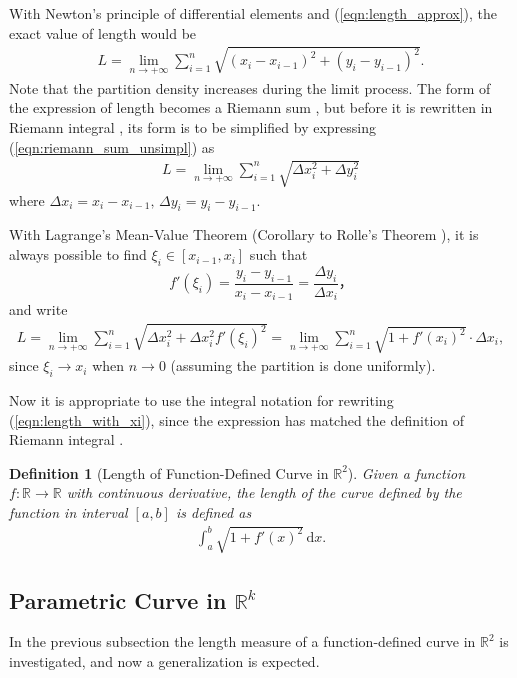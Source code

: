 \documentclass[12pt,a4paper]{article}
\newtheorem{definition}{Definition}
\newcommand{\eqnref}[1]{(\ref{#1})}
\begin{document}
With Newton's principle of differential elements \cite{newton_pnpm} and \eqnref{eqn:length_approx}, the exact value of length would be \begin{gather}\label{eqn:riemann_sum_unsimpl}L=\lim_{n\to+\infty}\sum_{i=1}^n\sqrt{(x_i-x_{i-1})^2+(y_i-y_{i-1})^2}.\end{gather} Note that the partition density increases during the limit process. The form of the expression of length becomes a Riemann sum \cite{riemann_sum_integral}, but before it is rewritten in Riemann integral \cite{riemann_sum_integral}, its form is to be simplified by expressing \eqnref{eqn:riemann_sum_unsimpl} as \begin{gather}\label{eqn:length_with_delta}L=\lim_{n\to+\infty}\sum_{i=1}^n\sqrt{\Delta x_i^2+\Delta y_i^2}\end{gather} where $\Delta x_i=x_i-x_{i-1},\, \Delta y_i=y_i-y_{i-1}$.

With Lagrange's Mean-Value Theorem (Corollary to Rolle's Theorem \cite{drobisch_rolle_theorem}), it is always possible to find $\xi_i\in[x_{i-1},x_i]$ such that \[f'(\xi_i)=\frac{y_i-y_{i-1}}{x_i-x_{i-1}}=\frac{\Delta y_i}{\Delta x_i}，\] and write \begin{gather}\label{eqn:length_with_xi}L=\lim_{n\to+\infty}\sum_{i=1}^n\sqrt{\Delta x_i^2+\Delta x_i^2f'(\xi_i)^2}=\lim_{n\to+\infty}\sum_{i=1}^n\sqrt{1+f'(x_i)^2}\cdot\Delta x_i,\end{gather} since $\xi_i\to x_i$ when $n\to0$ (assuming the partition is done uniformly).

Now it is appropriate to use the integral notation for rewriting \eqnref{eqn:length_with_xi}, since the expression has matched the definition of Riemann integral \cite{riemann_sum_integral}.

\begin{definition}[Length of Function-Defined Curve in $\mathbb{R}^2$]\label{def:length_func_bi}
Given a function $f:\mathbb{R}\to\mathbb{R}$ with continuous derivative, the length of the curve defined by the function in interval $[a,b]$ is defined as
\begin{gather}
\label{eqn:length_func}
\int_a^b\sqrt{1+f'(x)^2}\,\mathrm{d}x.
\end{gather}
\end{definition}

\subsection{Parametric Curve in $\mathbb{R}^k$}
In the previous subsection the length measure of a function-defined curve in $\mathbb{R}^2$ is investigated, and now a generalization is expected.
\end{document}
